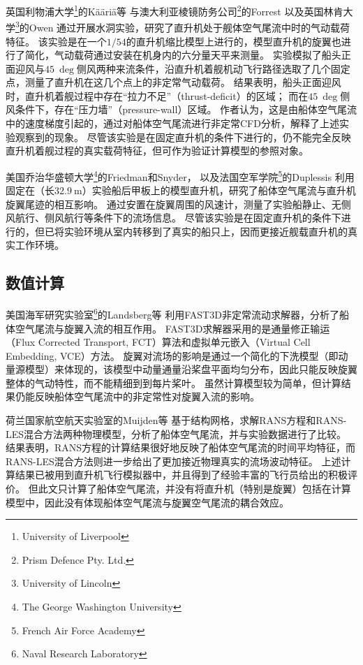 英国利物浦大学\footnote{University of Liverpool}的Kääriä等
与澳大利亚棱镜防务公司\footnote{Prism Defence Pty. Ltd.}的Forrest
以及英国林肯大学\footnote{University of Lincoln}的Owen
通过开展水洞实验，研究了直升机处于舰体空气尾流中时的气动载荷特征。
该实验是在一个$1/54$的直升机缩比模型上进行的，模型直升机的旋翼也进行了简化，气动载荷通过安装在机身内的六分量天平来测量。
实验模拟了船头正面迎风与$45~\deg$侧风两种来流条件，沿直升机着舰机动飞行路径选取了几个固定点，测量了直升机在这几个点上的非定常气动载荷。
结果表明，船头正面迎风时，直升机着舰过程中存在“拉力不足”（thrust-deficit）的区域；
而在$45~\deg$侧风条件下，存在“压力墙”（pressure-wall）区域。
作者认为，这是由船体空气尾流中的速度梯度引起的，通过对船体空气尾流进行非定常CFD分析，解释了上述实验观察到的现象。
尽管该实验是在固定直升机的条件下进行的，仍不能完全反映直升机着舰过程的真实载荷特征，但可作为验证计算模型的参照对象。

美国乔治华盛顿大学\footnote{The George Washington University}的Friedman和Snyder，
以及法国空军学院\footnote{French Air Force Academy}的Duplessis
利用固定在（长$32.9~\mathrm{m}$）实验船后甲板上的模型直升机，研究了船体空气尾流与直升机旋翼尾迹的相互影响。
通过安置在旋翼周围的风速计，测量了实验船静止、无侧风航行、侧风航行等条件下的流场信息。
尽管该实验是在固定直升机的条件下进行的，但已将实验环境从室内转移到了真实的船只上，因而更接近舰载直升机的真实工作环境。

\subsection{数值计算}
美国海军研究实验室\footnote{Naval Research Laboratory}的Landsberg等
利用FAST3D非定常流动求解器，分析了船体空气尾流与旋翼入流的相互作用。
FAST3D求解器采用的是通量修正输运（Flux Corrected Transport, FCT）算法和虚拟单元嵌入（Virtual Cell Embedding, VCE）方法。
旋翼对流场的影响是通过一个简化的下洗模型（即动量源模型）来体现的，该模型中动量通量沿桨盘平面均匀分布，因此只能反映旋翼整体的气动特性，而不能精细到到每片桨叶。
虽然计算模型较为简单，但计算结果仍能反映船体空气尾流中的非定常性对旋翼入流的影响。

荷兰国家航空航天实验室的Muijden等
基于结构网格，求解RANS方程和RANS-LES混合方法两种物理模型，分析了船体空气尾流，并与实验数据进行了比较。
结果表明，RANS方程的计算结果很好地反映了船体空气尾流的时间平均特征，而RANS-LES混合方法则进一步给出了更加接近物理真实的流场波动特征。
上述计算结果已被用到直升机飞行模拟器中，并且得到了经验丰富的飞行员给出的积极评价。
但此文只计算了船体空气尾流，并没有将直升机（特别是旋翼）包括在计算模型中，因此没有体现船体空气尾流与旋翼空气尾流的耦合效应。

